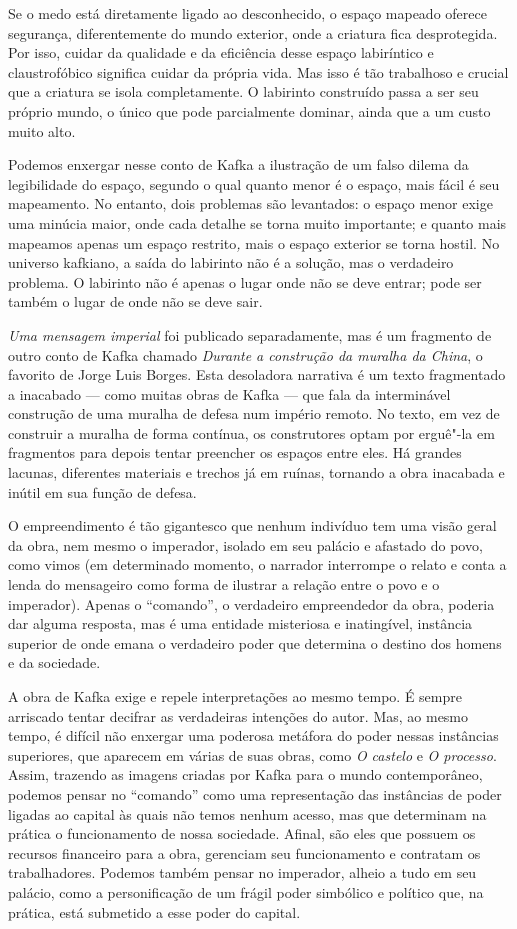 Se o medo está diretamente ligado ao desconhecido, o espaço mapeado
oferece segurança, diferentemente do mundo exterior, onde a criatura
fica desprotegida. Por isso, cuidar da qualidade e da eficiência desse
espaço labiríntico e claustrofóbico significa cuidar da própria vida.
Mas isso é tão trabalhoso e crucial que a criatura se isola
completamente. O labirinto construído passa a ser seu próprio mundo, o
único que pode parcialmente dominar, ainda que a um custo muito alto.

Podemos enxergar nesse conto de Kafka a ilustração de um falso dilema da
legibilidade do espaço, segundo o qual quanto menor é o espaço, mais
fácil é seu mapeamento. No entanto, dois problemas são levantados: o
espaço menor exige uma minúcia maior, onde cada detalhe se torna muito
importante; e quanto mais mapeamos apenas um espaço restrito\emph{,}
mais o espaço exterior se torna hostil. No universo kafkiano, a saída do
labirinto não é a solução, mas o verdadeiro problema. O labirinto não é
apenas o lugar onde não se deve entrar; pode ser também o lugar de onde
não se deve sair.

\emph{Uma mensagem imperial} foi publicado separadamente, mas é um
fragmento de outro conto de Kafka chamado \emph{Durante a construção da
muralha da China}, o favorito de Jorge Luis Borges. Esta desoladora
narrativa é um texto fragmentado a inacabado --- como muitas obras de
Kafka --- que fala da interminável construção de uma muralha de defesa
num império remoto. No texto, em vez de construir a muralha de forma
contínua, os construtores optam por erguê"-la em fragmentos para depois
tentar preencher os espaços entre eles. Há grandes lacunas, diferentes
materiais e trechos já em ruínas, tornando a obra inacabada e inútil em
sua função de defesa.

O empreendimento é tão gigantesco que nenhum indivíduo tem uma visão
geral da obra, nem mesmo o imperador, isolado em seu palácio e afastado
do povo, como vimos (em determinado momento, o narrador interrompe o
relato e conta a lenda do mensageiro como forma de ilustrar a relação
entre o povo e o imperador). Apenas o ``comando'', o verdadeiro
empreendedor da obra, poderia dar alguma resposta, mas é uma entidade
misteriosa e inatingível, instância superior de onde emana o verdadeiro
poder que determina o destino dos homens e da sociedade.

A obra de Kafka exige e repele interpretações ao mesmo tempo. É sempre
arriscado tentar decifrar as verdadeiras intenções do autor. Mas, ao
mesmo tempo, é difícil não enxergar uma poderosa metáfora do poder
nessas instâncias superiores, que aparecem em várias de suas obras, como
\emph{O castelo} e \emph{O processo}. Assim, trazendo as imagens criadas
por Kafka para o mundo contemporâneo, podemos pensar no ``comando'' como
uma representação das instâncias de poder ligadas ao capital às quais
não temos nenhum acesso, mas que determinam na prática o funcionamento
de nossa sociedade. Afinal, são eles que possuem os recursos financeiro
para a obra, gerenciam seu funcionamento e contratam os trabalhadores.
Podemos também pensar no imperador, alheio a tudo em seu palácio, como a
personificação de um frágil poder simbólico e político que, na prática,
está submetido a esse poder do capital.

